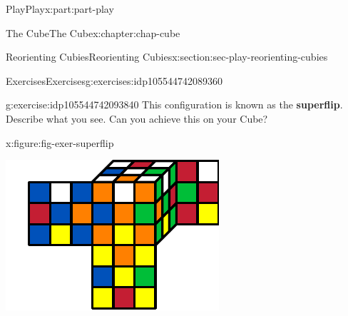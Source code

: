 \documentclass[oneside,10pt,]{book}
\newcommand{\terminology}[1]{\textbf{#1}}
\numberwithin{equation}{section}
\begin{document}
\begin{partptx}{Play}{}{Play}{}{}{x:part:part-play}
\begin{chapterptx}{The Cube}{}{The Cube}{}{}{x:chapter:chap-cube}
\begin{sectionptx}{Reorienting Cubies}{}{Reorienting Cubies}{}{}{x:section:sec-play-reorienting-cubies}
\begin{exercises-subsection-numberless}{Exercises}{}{Exercises}{}{}{g:exercises:idp105544742089360}
\begin{divisionexercise}{4}{}{}{g:exercise:idp105544742093840}
This configuration is known as the \terminology{superflip}. Describe what you see. Can you achieve this on your Cube?%
\begin{figureptx}{}{x:figure:fig-exer-superflip}{}%
\begin{image}{0.25}{0.5}{0.25}%
\includegraphics[width=\linewidth]{./images/superflip.pdf}
\end{image}%
\tcblower
\end{figureptx}%
\end{divisionexercise}%
\end{exercises-subsection-numberless}
\end{sectionptx}
\end{chapterptx}
\end{partptx}
%
%
\typeout{************************************************}
\typeout{************************************************}
%
\end{document}

